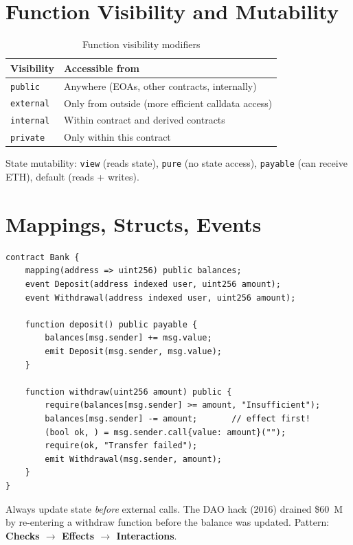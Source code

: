 \documentclass[12pt,a4paper,openany]{book}
\theoremstyle{definition}
\theoremstyle{plain}
\theoremstyle{remark}
\begin{document}
\section{Function Visibility and Mutability}

\begin{table}[h]
\centering
\caption{Function visibility modifiers}
\begin{tabular}{ll}
\toprule
\textbf{Visibility} & \textbf{Accessible from} \\
\midrule
\texttt{public}   & Anywhere (EOAs, other contracts, internally) \\
\texttt{external} & Only from outside (more efficient calldata access) \\
\texttt{internal} & Within contract and derived contracts \\
\texttt{private}  & Only within this contract \\
\bottomrule
\end{tabular}
\end{table}

State mutability: \texttt{view} (reads state), \texttt{pure} (no state
access), \texttt{payable} (can receive ETH), default (reads + writes).

\section{Mappings, Structs, Events}

\begin{lstlisting}[language=Solidity,caption=Bank contract with events]
contract Bank {
    mapping(address => uint256) public balances;
    event Deposit(address indexed user, uint256 amount);
    event Withdrawal(address indexed user, uint256 amount);

    function deposit() public payable {
        balances[msg.sender] += msg.value;
        emit Deposit(msg.sender, msg.value);
    }

    function withdraw(uint256 amount) public {
        require(balances[msg.sender] >= amount, "Insufficient");
        balances[msg.sender] -= amount;       // effect first!
        (bool ok, ) = msg.sender.call{value: amount}("");
        require(ok, "Transfer failed");
        emit Withdrawal(msg.sender, amount);
    }
}
\end{lstlisting}

\begin{exambox}[Reentrancy]
  Always update state \emph{before} external calls.  The DAO hack (2016)
  drained \$60~M by re-entering a withdraw function before the balance
  was updated.  Pattern: \textbf{Checks $\to$ Effects $\to$ Interactions}.
\end{exambox}
\end{document}
